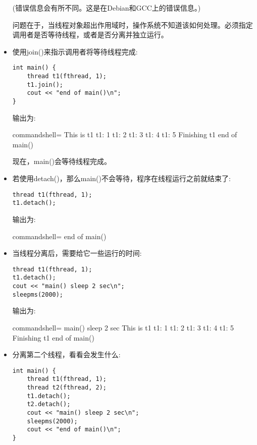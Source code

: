 \begin{itemize}
(错误信息会有所不同。这是在Debian和GCC上的错误信息。)

问题在于，当线程对象超出作用域时，操作系统不知道该如何处理。必须指定调用者是否等待线程，或者是否分离并独立运行。

\item 
使用join()来指示调用者将等待线程完成:

\begin{lstlisting}[style=styleCXX]
int main() {
	thread t1(fthread, 1);
	t1.join();
	cout << "end of main()\n";
}
\end{lstlisting}

输出为:

\begin{tcblisting}{commandshell={}}
This is t1
t1: 1
t1: 2
t1: 3
t1: 4
t1: 5
Finishing t1
end of main()
\end{tcblisting}

现在，main()会等待线程完成。

\item 
若使用detach()，那么main()不会等待，程序在线程运行之前就结束了:

\begin{lstlisting}[style=styleCXX]
thread t1(fthread, 1);
t1.detach();
\end{lstlisting}

输出为:

\begin{tcblisting}{commandshell={}}
end of main()
\end{tcblisting}

\item 
当线程分离后，需要给它一些运行的时间:

\begin{lstlisting}[style=styleCXX]
thread t1(fthread, 1);
t1.detach();
cout << "main() sleep 2 sec\n";
sleepms(2000);
\end{lstlisting}

输出为:

\begin{tcblisting}{commandshell={}}
main() sleep 2 sec
This is t1
t1: 1
t1: 2
t1: 3
t1: 4
t1: 5
Finishing t1
end of main()
\end{tcblisting}

\item 
分离第二个线程，看看会发生什么:

\begin{lstlisting}[style=styleCXX]
int main() {
	thread t1(fthread, 1);
	thread t2(fthread, 2);
	t1.detach();
	t2.detach();
	cout << "main() sleep 2 sec\n";
	sleepms(2000);
	cout << "end of main()\n";
}
\end{lstlisting}


\end{itemize}
